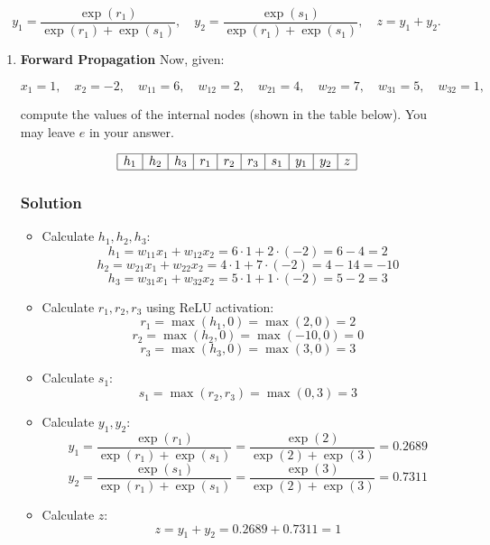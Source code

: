 \documentclass{article}
\begin{document}
\[
y_1 = \frac{\exp(r_1)}{\exp(r_1) + \exp(s_1)}, \quad
y_2 = \frac{\exp(s_1)}{\exp(r_1) + \exp(s_1)}, \quad
z = y_1 + y_2.
\]
\begin{enumerate}[label=\alph*)]
   \item \textbf{Forward Propagation} Now, given:


   \[
   x_1 = 1, \quad x_2 = -2, \quad w_{11} = 6, \quad w_{12} = 2, \quad w_{21} = 4, \quad w_{22} = 7, \quad w_{31} = 5, \quad w_{32} = 1,
   \]
   
   
   compute the values of the internal nodes (shown in the table below). You may leave \(e\) in your answer.
   
   
   
   \[
   \begin{array}{|c|c|c|c|c|c|c|c|c|c|}
   \hline
   h_1 & h_2 & h_3 & r_1 & r_2 & r_3 & s_1 & y_1 & y_2 & z \\
   \hline
   \end{array}
   \]
   \subsubsection*{Solution}
      \begin{itemize}
         \item Calculate \(h_1, h_2, h_3\):
         \[
         h_1 = w_{11} x_1 + w_{12} x_2 = 6 \cdot 1 + 2 \cdot (-2) = 6 - 4 = 2
         \]
         \[
         h_2 = w_{21} x_1 + w_{22} x_2 = 4 \cdot 1 + 7 \cdot (-2) = 4 - 14 = -10
         \]
         \[
         h_3 = w_{31} x_1 + w_{32} x_2 = 5 \cdot 1 + 1 \cdot (-2) = 5 - 2 = 3
         \]

         \item Calculate \(r_1, r_2, r_3\) using ReLU activation:
         \[
         r_1 = \max(h_1, 0) = \max(2, 0) = 2
         \]
         \[
         r_2 = \max(h_2, 0) = \max(-10, 0) = 0
         \]
         \[
         r_3 = \max(h_3, 0) = \max(3, 0) = 3
         \]

         \item Calculate \(s_1\):
         \[
         s_1 = \max(r_2, r_3) = \max(0, 3) = 3
         \]

         \item Calculate \(y_1, y_2\):
         \[
         y_1 = \frac{\exp(r_1)}{\exp(r_1) + \exp(s_1)} = \frac{\exp(2)}{\exp(2) + \exp(3)} = 0.2689
         \]
         \[
         y_2 = \frac{\exp(s_1)}{\exp(r_1) + \exp(s_1)} = \frac{\exp(3)}{\exp(2) + \exp(3)} = 0.7311
         \]

         \item Calculate \(z\):
         \[
         z = y_1 + y_2 = 0.2689 + 0.7311 = 1
         \]


\end{itemize}
\end{enumerate}
\end{document}
